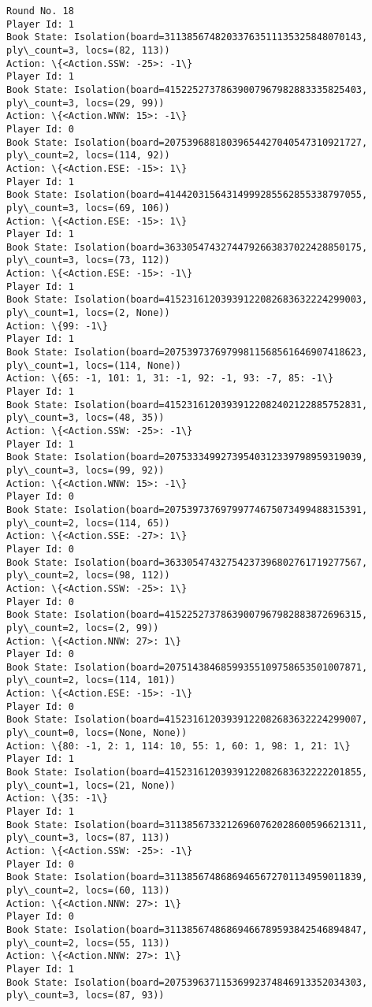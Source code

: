 \documentclass[11pt]{article}
\begin{document}
\begin{Verbatim}[commandchars=\\\{\}]
Round No. 18
Player Id: 1
Book State: Isolation(board=31138567482033763511135325848070143, ply\_count=3, locs=(82, 113))
Action: \{<Action.SSW: -25>: -1\}
Player Id: 1
Book State: Isolation(board=41522527378639007967982883335825403, ply\_count=3, locs=(29, 99))
Action: \{<Action.WNW: 15>: -1\}
Player Id: 0
Book State: Isolation(board=20753968818039654427040547310921727, ply\_count=2, locs=(114, 92))
Action: \{<Action.ESE: -15>: 1\}
Player Id: 1
Book State: Isolation(board=41442031564314999285562855338797055, ply\_count=3, locs=(69, 106))
Action: \{<Action.ESE: -15>: 1\}
Player Id: 1
Book State: Isolation(board=36330547432744792663837022428850175, ply\_count=3, locs=(73, 112))
Action: \{<Action.ESE: -15>: -1\}
Player Id: 1
Book State: Isolation(board=41523161203939122082683632224299003, ply\_count=1, locs=(2, None))
Action: \{99: -1\}
Player Id: 1
Book State: Isolation(board=20753973769799811568561646907418623, ply\_count=1, locs=(114, None))
Action: \{65: -1, 101: 1, 31: -1, 92: -1, 93: -7, 85: -1\}
Player Id: 1
Book State: Isolation(board=41523161203939122082402122885752831, ply\_count=3, locs=(48, 35))
Action: \{<Action.SSW: -25>: -1\}
Player Id: 1
Book State: Isolation(board=20753334992739540312339798959319039, ply\_count=3, locs=(99, 92))
Action: \{<Action.WNW: 15>: -1\}
Player Id: 0
Book State: Isolation(board=20753973769799774675073499488315391, ply\_count=2, locs=(114, 65))
Action: \{<Action.SSE: -27>: 1\}
Player Id: 0
Book State: Isolation(board=36330547432754237396802761719277567, ply\_count=2, locs=(98, 112))
Action: \{<Action.SSW: -25>: 1\}
Player Id: 0
Book State: Isolation(board=41522527378639007967982883872696315, ply\_count=2, locs=(2, 99))
Action: \{<Action.NNW: 27>: 1\}
Player Id: 0
Book State: Isolation(board=20751438468599355109758653501007871, ply\_count=2, locs=(114, 101))
Action: \{<Action.ESE: -15>: -1\}
Player Id: 0
Book State: Isolation(board=41523161203939122082683632224299007, ply\_count=0, locs=(None, None))
Action: \{80: -1, 2: 1, 114: 10, 55: 1, 60: 1, 98: 1, 21: 1\}
Player Id: 1
Book State: Isolation(board=41523161203939122082683632222201855, ply\_count=1, locs=(21, None))
Action: \{35: -1\}
Player Id: 1
Book State: Isolation(board=31138567332126960762028600596621311, ply\_count=3, locs=(87, 113))
Action: \{<Action.SSW: -25>: -1\}
Player Id: 0
Book State: Isolation(board=31138567486869465672701134959011839, ply\_count=2, locs=(60, 113))
Action: \{<Action.NNW: 27>: 1\}
Player Id: 0
Book State: Isolation(board=31138567486869466789593842546894847, ply\_count=2, locs=(55, 113))
Action: \{<Action.NNW: 27>: 1\}
Player Id: 1
Book State: Isolation(board=20753963711536992374846913352034303, ply\_count=3, locs=(87, 93))

\end{Verbatim}
\end{document}
